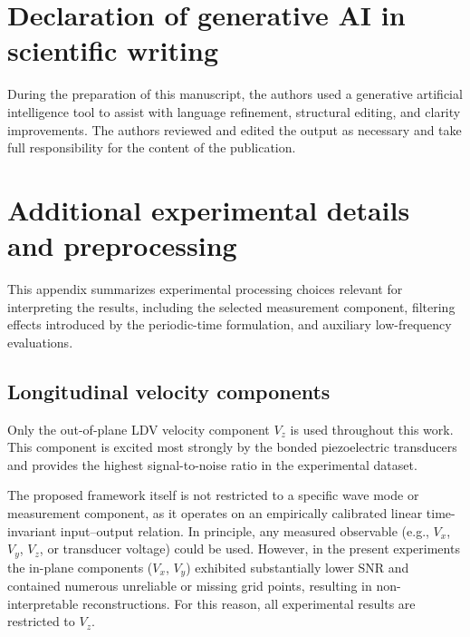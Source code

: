 \documentclass[a4paper,fleqn]{cas-sc}
\begin{document}
\printcredits %

\section*{Declaration of generative AI in scientific writing}

During the preparation of this manuscript, the authors used a generative artificial intelligence tool to assist with language refinement, structural editing, and clarity improvements. The authors reviewed and edited the output as necessary and take full responsibility for the content of the publication.


%




\newpage
\appendix
\section{Additional experimental details and preprocessing}
\label{Appendix_A}

This appendix summarizes experimental processing choices relevant for interpreting the results, including the selected measurement component, filtering effects introduced by the periodic-time formulation, and auxiliary low-frequency evaluations.

\subsection{Longitudinal velocity components}
\label{Appendix_VelocityComponents}

Only the out-of-plane LDV velocity component $V_z$ is used throughout this work. This component is excited most strongly by the bonded piezoelectric transducers and provides the highest signal-to-noise ratio in the experimental dataset. 

The proposed framework itself is not restricted to a specific wave mode or measurement component, as it operates on an empirically calibrated linear time-invariant input–output relation. In principle, any measured observable (e.g., $V_x$, $V_y$, $V_z$, or transducer voltage) could be used. However, in the present experiments the in-plane components ($V_x$, $V_y$) exhibited substantially lower SNR and contained numerous unreliable or missing grid points, resulting in non-interpretable reconstructions. For this reason, all experimental results are restricted to $V_z$.
\end{document}
